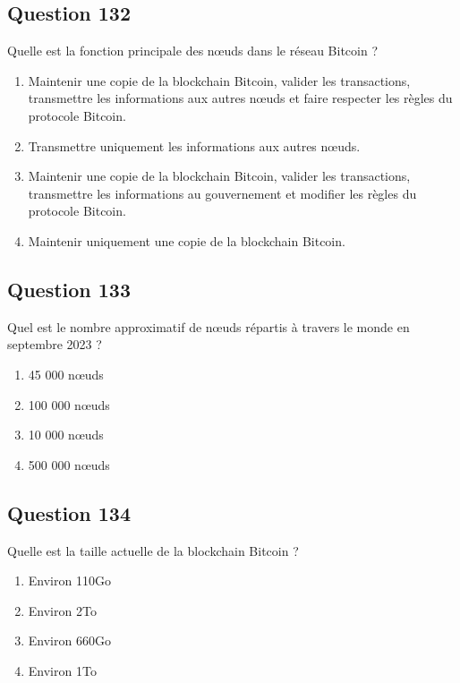\documentclass[12pt,a4paper]{article}
\begin{document}
\bigskip


\subsection*{Question 132}
Quelle est la fonction principale des nœuds dans le réseau Bitcoin ?

\begin{enumerate}[label=\Alph*., leftmargin=*]
\item Maintenir une copie de la blockchain Bitcoin, valider les transactions, transmettre les informations aux autres nœuds et faire respecter les règles du protocole Bitcoin.
\item Transmettre uniquement les informations aux autres nœuds.
\item Maintenir une copie de la blockchain Bitcoin, valider les transactions, transmettre les informations au gouvernement et modifier les règles du protocole Bitcoin.
\item Maintenir uniquement une copie de la blockchain Bitcoin.
\end{enumerate}

\bigskip


\subsection*{Question 133}
Quel est le nombre approximatif de nœuds répartis à travers le monde en septembre 2023 ?

\begin{enumerate}[label=\Alph*., leftmargin=*]
\item 45 000 nœuds
\item 100 000 nœuds
\item 10 000 nœuds
\item 500 000 nœuds
\end{enumerate}

\bigskip


\subsection*{Question 134}
Quelle est la taille actuelle de la blockchain Bitcoin ?

\begin{enumerate}[label=\Alph*., leftmargin=*]
\item Environ 110Go
\item Environ 2To
\item Environ 660Go
\item Environ 1To
\end{enumerate}
\end{document}
